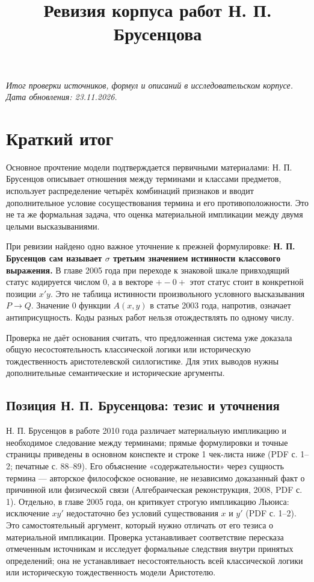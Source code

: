 \documentclass[12pt,a4paper]{article}
\title{Ревизия корпуса работ Н. П. Брусенцова}
\author{}
\date{}
\begin{document}
\maketitle

\emph{Итог проверки источников, формул и описаний в исследовательском корпусе. Дата обновления: 23.11.2026.}

\section{Краткий итог}

Основное прочтение модели подтверждается первичными материалами: Н. П. Брусенцов описывает отношения между терминами и классами предметов, использует распределение четырёх комбинаций признаков и вводит дополнительное условие сосуществования термина и его противоположности. Это не та же формальная задача, что оценка материальной импликации между двумя целыми высказываниями.

При ревизии найдено одно важное уточнение к прежней формулировке: \textbf{Н. П. Брусенцов сам называет \(\sigma\) третьим значением истинности классового выражения.} В главе 2005 года при переходе к знаковой шкале привходящий статус кодируется числом \(0\), а в векторе \(+-0+\) этот статус стоит в конкретной позиции \(x'y\). Это не таблица истинности произвольного условного высказывания \(P\to Q\). Значение \(0\) функции \(A(x,y)\) в статье 2003 года, напротив, означает антиприсущность. Коды разных работ нельзя отождествлять по одному числу.

Проверка не даёт основания считать, что предложенная система уже доказала общую несостоятельность классической логики или историческую тождественность аристотелевской силлогистике. Для этих выводов нужны дополнительные семантические и исторические аргументы.

\subsection*{Позиция Н. П. Брусенцова: тезис и уточнения}

Н. П. Брусенцов в работе 2010 года различает материальную импликацию и необходимое следование между терминами; прямые формулировки и точные страницы приведены в основном конспекте и строке 1 чек-листа ниже (PDF с. 1–2; печатные с. 88–89). Его объяснение «содержательности» через сущность термина — авторское философское основание, не независимо доказанный факт о причинной или физической связи (Алгебраическая реконструкция, 2008, PDF с. 1). Отдельно, в главе 2005 года, он критикует строгую импликацию Льюиса: исключение \(xy'\) недостаточно без условий существования \(x\) и \(y'\) (PDF с. 1–2). Это самостоятельный аргумент, который нужно отличать от его тезиса о материальной импликации. Проверка устанавливает соответствие пересказа отмеченным источникам и исследует формальные следствия внутри принятых определений; она не устанавливает несостоятельность всей классической логики или историческую тождественность модели Аристотелю.
\end{document}
